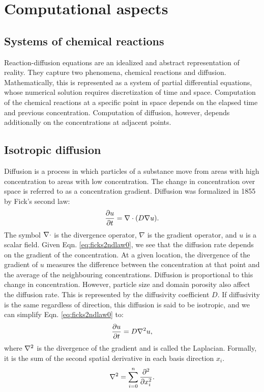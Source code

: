 \newcommand{\Morph}{u}

\chapter{Computational aspects}
\section{Systems of chemical reactions}
Reaction-diffusion equations are an idealized and abstract representation of reality. They capture two phenomena, chemical reactions and diffusion. Mathematically, this is represented as a system of partial differential equations, whose numerical solution requires discretization of time and space. Computation of the chemical reactions at a specific point in space depends on the elapsed time and previous concentration. Computation of diffusion, however, depends additionally on the concentrations at adjacent points.

\section{Isotropic diffusion}
Diffusion is a process in which particles of a substance move from areas with high concentration to areas with low concentration. The change in concentration over space is referred to as a concentration gradient. Diffusion was formalized in 1855 by Fick's second law:
\begin{equation}
\label{eq:ficks2ndlaw0}
	\frac{\partial \Morph}{\partial t} = \Div (D \nabla \Morph).
\end{equation}
The symbol $\nabla \cdot$ is the divergence operator, $\nabla$ is the gradient operator, and $\Morph$ is a scalar field. Given Eqn. \ref{eq:ficks2ndlaw0}, we see that the diffusion rate depends on the gradient of the concentration. At a given location, the divergence of the gradient of $\Morph$ measures the difference between the concentration at that point and the average of the neighbouring concentrations. Diffusion is proportional to this change in concentration. However, particle size and domain porosity also affect the diffusion rate. This is represented by the diffusivity coefficient $D$. If diffusivity is the same regardless of direction, this diffusion is said to be isotropic, and we can simplify Eqn. \ref{eq:ficks2ndlaw0} to:
\begin{equation}
\label{eq:ficks2ndlaw1}
	\frac{\partial \Morph}{\partial t} = D \Lap \Morph,
\end{equation}
where $\nabla^2$ is the divergence of the gradient and is called the Laplacian. Formally, it is the sum of the second spatial derivative in each basis direction $x_i$.
\begin{equation}
\label{eq:laplacian}
	\nabla^2 = \sum_{i=0}^{n} \frac{\partial^2}{\partial x_i^2}.
\end{equation}
	
